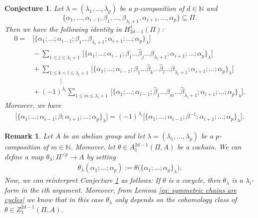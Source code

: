 \documentclass[10pt,a4paper]{amsart}
\numberwithin{equation}{section}
\newtheorem{conje}[Theorem]{Conjecture}
\newtheorem{Remark}[Theorem]{Remark}
\newcommand{\NN }{\mathbb{N}}
\begin{document}
\begin{conje} \label{conje: symmetrized cycles are n-forms in arguments}
 Let $\lambda=(\lambda_1,\dots,\lambda_p)$ be a $p$-composition of $d \in \NN$ and
 \[\{\alpha_1,\dots,\alpha_{i-1},\beta_1, \dots, \beta_{\lambda_{i}+1},\alpha_{i+1}, \dots ,\alpha_p\} \subseteq \Pi.\]
 Then we have the following identity in $H_{2d-1}^1(\Pi)$:
 \begin{align*}
 0={}&\big[\{\alpha_1;\dots;\alpha_{i-1};\beta_1\dots\beta_{\lambda_{i}+1};\alpha_{i+1}; \dots ;\alpha_p\}_\lambda \big] \\
 &{}-\sum_{1 \leq j \leq \lambda_{i}+1} \, \big[\{\alpha_1;\dots;\alpha_{i-1};\beta_1\dots \hat{\beta}_j\dots \beta_{\lambda_{i}+1};\alpha_{i+1}; \dots ;\alpha_p\}_\lambda \big] \\
 &{}+\sum_{1\leq k < l \leq \lambda_{i}+1} \, \big[\{\alpha_1;\dots;\alpha_{i-1};\beta_1\dots \hat{\beta}_k \dots \hat{\beta}_l\dots \beta_{\lambda_{i}+1};\alpha_{i+1}; \dots ;\alpha_p\}_\lambda \big]\\
 &\qquad\qquad\vdots\\
 &{}+(-1)^{\lambda_i}\sum_{1\leq m \leq \lambda_{i}+1}\, \big[\{\alpha_1;\dots;\alpha_{i-1};\hat{\beta}_1\dots \beta_m\dots \hat{\beta}_{\lambda_{i}+1};\alpha_{i+1}; \dots ;\alpha_p\}_\lambda \big].
 \end{align*}
 Moreover, we have
 \begin{align*}
 \big[\{\alpha_1;\dots;\alpha_{i-1};\beta;\alpha_{i+1}; \dots;\alpha_p\}_\lambda \big]=(-1)^{\lambda_i}\big[\big\{\alpha_1;\dots;\alpha_{i-1};\beta^{-1};\alpha_{i+1}; \dots;\alpha_p\big\}_\lambda \big].
 \end{align*}
\end{conje}

\begin{Remark}\label{rem: n-form}
 Let $A$ be an abelian group and let $\lambda=(\lambda_1,\dots,\lambda_p)$ be a $p$-composition of $m \in \NN$. Moreover, let $\theta \in A^{2d-1}_1(\Pi,A)$ be a cochain. We can define a map $\theta_\lambda\colon\Pi^{\times p} \to A$ by setting
 \begin{align*}
 \theta_\lambda(\alpha_1;\dots;\alpha_p):=\theta\big( \{\alpha_1;\dots;\alpha_p\}_\lambda\big).
 \end{align*}
 Now, we can reinterpret Conjecture \ref{conje: symmetrized cycles are n-forms in arguments} as follows: If $\theta$ is a cocycle, then $\theta_\lambda$ is a $\lambda_i$-form in the $i$th argument. Moreover, from Lemma \ref{eq: symmetric chains are cycles} we know that in this case $\theta_\lambda$ only depends on the cohomology class of $\theta \in Z^{2d-1}_1(\Pi,A)$.
\end{Remark}
\end{document}
